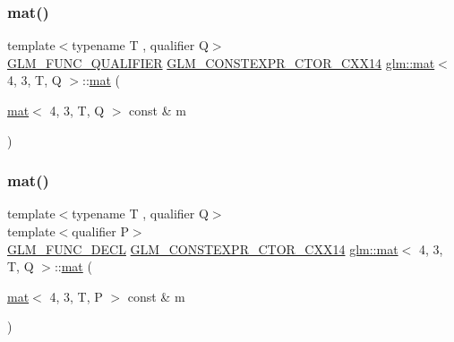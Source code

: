 \subsubsection{\texorpdfstring{mat()}{mat()}\hspace{0.1cm}{\footnotesize\ttfamily [2/21]}}
{\footnotesize\ttfamily template$<$typename T , qualifier Q$>$ \\
\mbox{\hyperlink{setup_8hpp_a33fdea6f91c5f834105f7415e2a64407}{G\+L\+M\+\_\+\+F\+U\+N\+C\+\_\+\+Q\+U\+A\+L\+I\+F\+I\+ER}} \mbox{\hyperlink{setup_8hpp_a0900f9145e68bf6061b6f5e7be3fa751}{G\+L\+M\+\_\+\+C\+O\+N\+S\+T\+E\+X\+P\+R\+\_\+\+C\+T\+O\+R\+\_\+\+C\+X\+X14}} \mbox{\hyperlink{structglm_1_1mat}{glm\+::mat}}$<$ 4, 3, T, Q $>$\+::\mbox{\hyperlink{structglm_1_1mat}{mat}} (\begin{DoxyParamCaption}\item[{\mbox{\hyperlink{structglm_1_1mat}{mat}}$<$ 4, 3, T, Q $>$ const \&}]{m }\end{DoxyParamCaption})}

\mbox{\label{structglm_1_1mat_3_014_00_013_00_01_t_00_01_q_01_4_afe2aacdb76797f1fcfef7e6d1268c764}} 
\subsubsection{\texorpdfstring{mat()}{mat()}\hspace{0.1cm}{\footnotesize\ttfamily [3/21]}}
{\footnotesize\ttfamily template$<$typename T , qualifier Q$>$ \\
template$<$qualifier P$>$ \\
\mbox{\hyperlink{setup_8hpp_ab2d052de21a70539923e9bcbf6e83a51}{G\+L\+M\+\_\+\+F\+U\+N\+C\+\_\+\+D\+E\+CL}} \mbox{\hyperlink{setup_8hpp_a0900f9145e68bf6061b6f5e7be3fa751}{G\+L\+M\+\_\+\+C\+O\+N\+S\+T\+E\+X\+P\+R\+\_\+\+C\+T\+O\+R\+\_\+\+C\+X\+X14}} \mbox{\hyperlink{structglm_1_1mat}{glm\+::mat}}$<$ 4, 3, T, Q $>$\+::\mbox{\hyperlink{structglm_1_1mat}{mat}} (\begin{DoxyParamCaption}\item[{\mbox{\hyperlink{structglm_1_1mat}{mat}}$<$ 4, 3, T, P $>$ const \&}]{m }\end{DoxyParamCaption})}

\mbox{\label{structglm_1_1mat_3_014_00_013_00_01_t_00_01_q_01_4_a6a797b407bea1827cf196545f04fb6ca}} 
